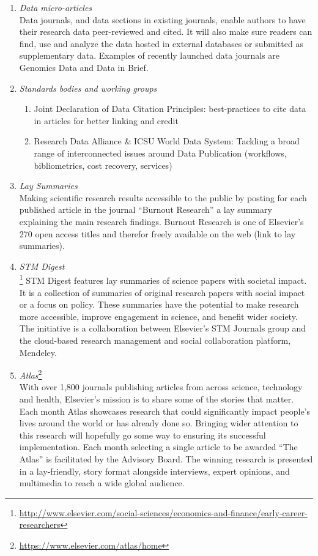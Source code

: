 \documentclass[a4paper,USenglish]{dagrep}
\begin{document}
\begin{enumerate}
\item \emph{Data micro-articles}\\
Data journals, and data sections in existing journals, enable authors to have their research data peer-reviewed and cited. It will also make sure readers can find, use and analyze the data hosted in external databases or submitted as supplementary data. Examples of recently launched data journals are Genomics Data and Data in Brief.
\item \emph{Standards bodies and working groups}
  \begin{enumerate}
  \item Joint Declaration of Data Citation Principles: best-practices to cite data in articles for better linking and credit
  \item Research Data Alliance \& ICSU World Data System: Tackling a broad range of interconnected issues around Data Publication (workflows, bibliometrics, cost recovery, services)
  \end{enumerate}
\item \emph{Lay Summaries}\\
Making scientific research results accessible to the public by posting for each published article in the journal “Burnout Research” a lay summary explaining the main research findings. Burnout Research is one of Elsevier's 270 open access titles and therefor freely available on the web (link to lay summaries).
\item \emph{STM Digest}\\
\footnote{\url{http://www.elsevier.com/social-sciences/economics-and-finance/early-career-researchers}} STM Digest features lay summaries of science papers with societal impact. It is a collection of summaries of original research papers with social impact or a focus on policy. These summaries have the potential to make research more accessible, improve engagement in science, and benefit wider society. The initiative is a collaboration between Elsevier's STM Journals group and the cloud-based research management and social collaboration platform, Mendeley.
\item \emph{Atlas}\footnote{\url{https://www.elsevier.com/atlas/home}}\\
With over 1,800 journals publishing articles from across science, technology and health, Elsevier's mission is to share some of the stories that matter. Each month Atlas showcases research that could significantly impact people's lives around the world or has already done so. Bringing wider attention to this research will hopefully go some way to ensuring its successful implementation. Each month selecting a single article to be awarded “The Atlas” is facilitated by the Advisory Board. The winning research is presented in a lay-friendly, story format alongside interviews, expert opinions, and multimedia to reach a wide global audience.
\end{enumerate}
\end{document}
